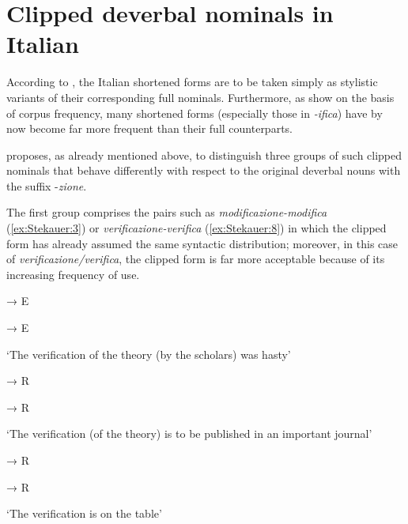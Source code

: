 \documentclass[output=paper]{langsci/langscibook}
\begin{document}
\section{Clipped deverbal nominals in
Italian}\label{Stekauer-clipped-deverbal-nominals-in-italian}

According to %
\citet[519]{Thornton1990a,Thornton2004}%
%
, the Italian shortened forms are
to be taken simply as stylistic variants of their corresponding full
nominals. Furthermore, as %
\citet[193--194]{MonterminiThornton2014} %
%
show on
the basis of  corpus frequency, many shortened forms (especially
those in \emph{-ifica}) have by now become far more frequent than their
full counterparts.

%
\citet{Stichauer2006} %
%
proposes, as already mentioned above, to distinguish
three groups of such clipped nominals that behave differently with
respect to the original deverbal nouns with the suffix -\emph{zione}.

The first group comprises the pairs such as
\emph{modificazione-modifica} (\ref{ex:Stekauer:3}) or
\emph{verificazione-verifica} (\ref{ex:Stekauer:8}) in which the clipped form has
already assumed the same syntactic distribution; moreover, in this case
of \emph{verificazione/verifica}, the clipped form is far more
acceptable because of its increasing frequency of use.

\begin{exe}
\ex\label{ex:Stekauer:8}
\begin{xlist}
 → E

 → E

\trans `The verification of the theory (by the scholars) was hasty'

 → R

 → R

`The verification (of the theory) is to be published in an important
journal'

 → R

 → R

\trans `The verification is on the table'
\end{xlist}
\end{exe}
\end{document}
